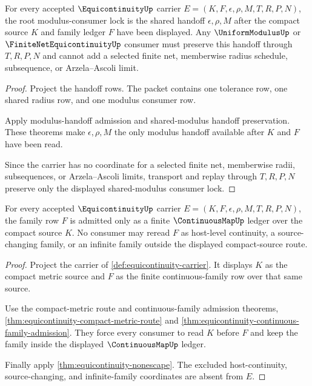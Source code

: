\begin{theorem}
\label{thm:equicontinuity-root-modulus-consumer-lock}
For every accepted $\EquicontinuityUp$ carrier $E=(K,F,\epsilon,\rho,M,T,R,P,N)$, the root modulus-consumer lock is the shared handoff $\epsilon,\rho,M$ after the compact source $K$ and family ledger $F$ have been displayed. Any $\UniformModulusUp$ or $\FiniteNetEquicontinuityUp$ consumer must preserve this handoff through $T,R,P,N$ and cannot add a selected finite net, memberwise radius schedule, subsequence, or Arzela--Ascoli limit.
\end{theorem}
\begin{proof}
Project the handoff rows. The packet contains one tolerance row, one shared radius row, and one modulus consumer row.

Apply modulus-handoff admission and shared-modulus handoff preservation. These theorems make $\epsilon,\rho,M$ the only modulus handoff available after $K$ and $F$ have been read.

Since the carrier has no coordinate for a selected finite net, memberwise radii, subsequences, or Arzela--Ascoli limits, transport and replay through $T,R,P,N$ preserve only the displayed shared-modulus consumer lock.
\end{proof}

\begin{theorem}
\label{thm:equicontinuity-continuous-family-ledger-admission}
For every accepted $\EquicontinuityUp$ carrier $E=(K,F,\epsilon,\rho,M,T,R,P,N)$, the family row $F$ is admitted only as a finite $\ContinuousMapUp$ ledger over the compact source $K$. No consumer may reread $F$ as host-level continuity, a source-changing family, or an infinite family outside the displayed compact-source route.
\end{theorem}
\begin{proof}
Project the carrier of \autoref{def:equicontinuity-carrier}. It displays $K$ as the compact metric source and $F$ as the finite continuous-family row over that same source.

Use the compact-metric route and continuous-family admission theorems, \autoref{thm:equicontinuity-compact-metric-route} and \autoref{thm:equicontinuity-continuous-family-admission}. They force every consumer to read $K$ before $F$ and keep the family inside the displayed $\ContinuousMapUp$ ledger.

Finally apply \autoref{thm:equicontinuity-nonescape}. The excluded host-continuity, source-changing, and infinite-family coordinates are absent from $E$.
\end{proof}

